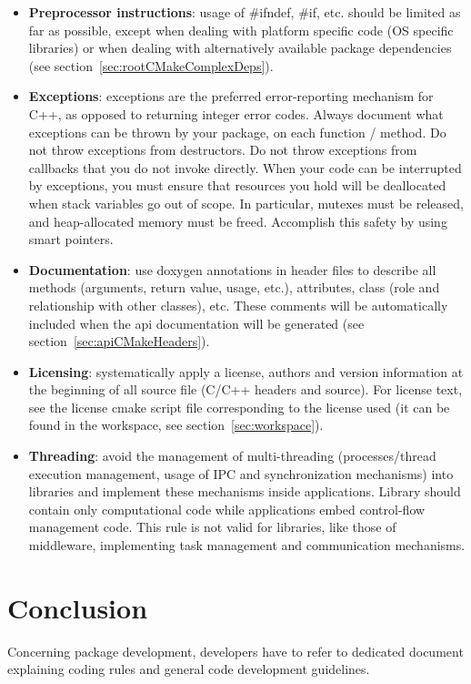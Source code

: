 \documentclass[12pt,a4paper]{article}
\begin{document}
\begin{itemize}
\item \textbf{Preprocessor instructions}: usage of \#ifndef, \#if, etc. should be limited as far as possible, except when dealing with platform specific code (OS specific libraries) or when dealing with alternatively available package dependencies (see section~\ref{sec:rootCMakeComplexDeps}).
\item \textbf{Exceptions}: exceptions are the preferred error-reporting mechanism for C++, as opposed to returning integer error codes. Always document what exceptions can be thrown by your package, on each function / method. Do not throw exceptions from destructors. Do not throw exceptions from callbacks that you do not invoke directly. When your code can be interrupted by exceptions, you must ensure that resources you hold will be deallocated when stack variables go out of scope. In particular, mutexes must be released, and heap-allocated memory must be freed. Accomplish this safety by using smart pointers.
\item \textbf{Documentation}: use doxygen annotations in header files to describe all methods (arguments, return value, usage, etc.), attributes, class (role and relationship with other classes), etc. These comments will be automatically included when the api documentation will be generated (see section~\ref{sec:apiCMakeHeaders}).
\item \textbf{Licensing}: systematically apply a license, authors and version information at the beginning of all source file (C/C++ headers and source). For license text, see the license cmake script file corresponding to the license used (it can be found in the workspace, see section~\ref{sec:workspace}).
\item \textbf{Threading}: avoid the management of multi-threading (processes/thread execution management, usage of IPC and synchronization mechanisms) into libraries and implement these mechanisms inside applications. Library should contain only computational code while applications embed control-flow management code. This rule is not valid for libraries, like those of middleware, implementing task management and communication mechanisms.
\end{itemize}

\pagebreak

\part*{Conclusion}

Concerning package development, developers have to refer to dedicated document explaining coding rules and general code development guidelines.
\end{document}
